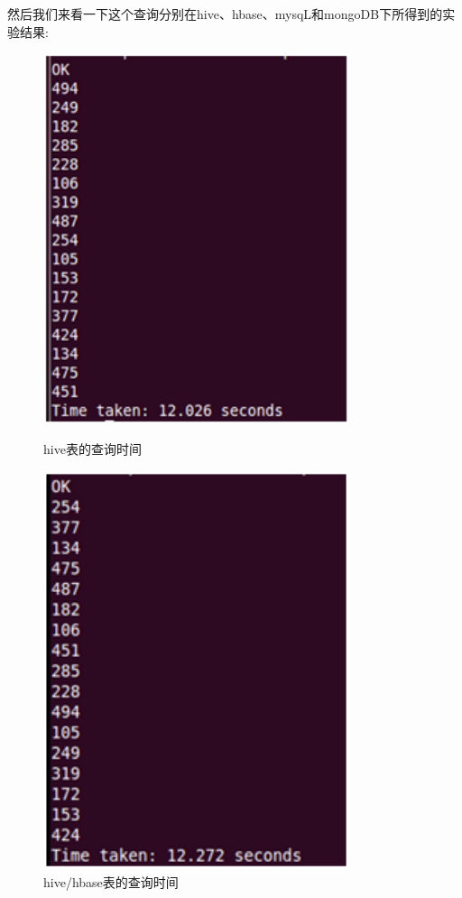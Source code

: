然后我们来看一下这个查询分别在hive、hbase、mysqL和mongoDB下所得到的实验结果:
\begin{description}

\item
\begin{figure}[h]
\begin{minipage}[t]{0.45\linewidth}
\centering
\includegraphics[width=0.8\textwidth]{photo/xjh1.png}
\caption{hive表的查询时间}
\end{minipage}
\hfill
\begin{minipage}[t]{0.45\linewidth}
\centering
\includegraphics[width=0.8\textwidth]{photo/xjh2.png}
\caption{hive/hbase表的查询时间}
\end{minipage}
\end{figure}


\end{description}
